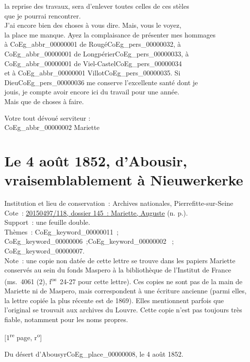 \documentclass{book}
\begin{document}
la reprise des travaux, sera d’enlever toutes celles de ces stèles\\
que je pourrai rencontrer.\\
\indent J’ai encore bien des choses à vous dire. Mais, vous le voyez,\\
la place me manque. Ayez la complaisance de présenter mes hommages\\
à \gls{CoEg_abbr_00000001} de Rougé\gls{CoEg_pers_00000032}, à \gls{CoEg_abbr_00000001} de Longpérier\gls{CoEg_pers_00000033}, à \gls{CoEg_abbr_00000001} de Viel-Castel\gls{CoEg_pers_00000034}\\
et à \gls{CoEg_abbr_00000001} Villot\gls{CoEg_pers_00000035}. Si Dieu\gls{CoEg_pers_00000036} me conserve l’excellente santé dont je\\
jouis, je compte avoir encore ici du travail pour une année.\\
\indent Mais que de choses à faire.
\begin{center} \hspace{5cm} Votre tout dévoué serviteur :\\
\hspace{5cm} \gls{CoEg_abbr_00000002} Mariette\end{center}
\hypertarget{CoEg_Mariette_1852-08-04}{}
\section*{Le 4 août 1852, d’Abousir, vraisemblablement à Nieuwerkerke}  
{\footnotesize \noindent Institution et lieu de conservation~: Archives nationales, Pierrefitte-sur-Seine\\
Cote~: \hyperlink{CoEg_Mariette_ms_001}{20150497/118, dossier 145~: Mariette, Auguste} (n. p.).\\
Support~: une feuille double.\\
Thèmes~: \gls{CoEg_keyword_00000011}~; \gls{CoEg_keyword_00000006}~;\gls{CoEg_keyword_00000002} ~; \gls{CoEg_keyword_00000007}.\\
Note~: une copie non datée de cette lettre se trouve dans les papiers Mariette conservés au sein du fonds Maspero à la bibliothèque de l’Institut de France (ms.~4061 (2), f\textsuperscript{os}~24-27 pour cette lettre). Ces copies ne sont pas de la main de Mariette ni de Maspero, mais correspondent à une écriture ancienne (parmi elles, la lettre copiée la plus récente est de 1869). Elles mentionnent parfois que l’original se trouvait aux archives du Louvre. Cette copie n’est pas toujours très fiable, notamment pour les noms propres.
\begin{center} {[1\textsuperscript{re} page, r\textsuperscript{o}]}\end{center}}
\begin{flushright} Du désert d’Abousyr\gls{CoEg_place_00000008}, le 4 août 1852.\end{flushright}
\end{document}

